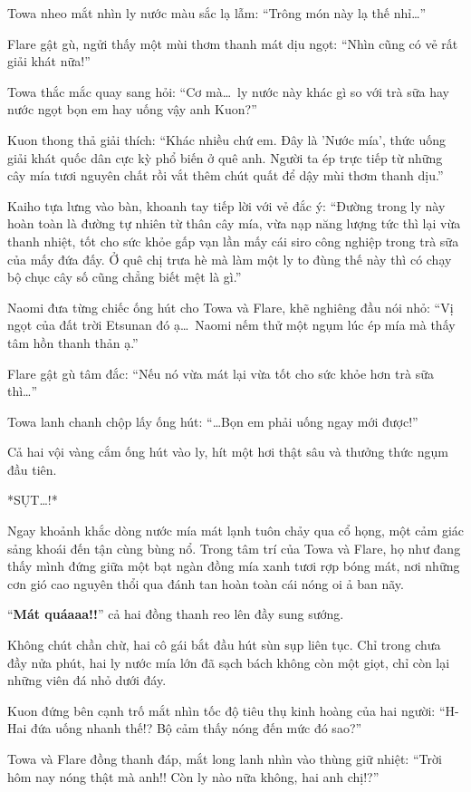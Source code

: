 \documentclass[../main.tex]{subfiles}
\begin{document}
Towa nheo mắt nhìn ly nước màu sắc lạ lẫm: ``Trông món này lạ thế nhỉ\dots''

Flare gật gù, ngửi thấy một mùi thơm thanh mát dịu ngọt: ``Nhìn cũng có vẻ rất giải khát nữa!''

Towa thắc mắc quay sang hỏi: ``Cơ mà\dots\ ly nước này khác gì so với trà sữa hay nước ngọt bọn em hay uống vậy anh Kuon?''

Kuon thong thả giải thích: ``Khác nhiều chứ em. Đây là 'Nước mía', thức uống giải khát quốc dân cực kỳ phổ biến ở quê anh. Người ta ép trực tiếp từ những cây mía tươi nguyên chất rồi vắt thêm chút quất để dậy mùi thơm thanh dịu.''

Kaiho tựa lưng vào bàn, khoanh tay tiếp lời với vẻ đắc ý: ``Đường trong ly này hoàn toàn là đường tự nhiên từ thân cây mía, vừa nạp năng lượng tức thì lại vừa thanh nhiệt, tốt cho sức khỏe gấp vạn lần mấy cái siro công nghiệp trong trà sữa của mấy đứa đấy. Ở quê chị trưa hè mà làm một ly to đùng thế này thì có chạy bộ chục cây số cũng chẳng biết mệt là gì.''

Naomi đưa từng chiếc ống hút cho Towa và Flare, khẽ nghiêng đầu nói nhỏ: ``Vị ngọt của đất trời Etsunan đó ạ\dots\ Naomi nếm thử một ngụm lúc ép mía mà thấy tâm hồn thanh thản ạ.''

Flare gật gù tâm đắc: ``Nếu nó vừa mát lại vừa tốt cho sức khỏe hơn trà sữa thì\dots''

Towa lanh chanh chộp lấy ống hút: ``\dots Bọn em phải uống ngay mới được!''

Cả hai vội vàng cắm ống hút vào ly, hít một hơi thật sâu và thưởng thức ngụm đầu tiên.

*SỤT\dots!*

Ngay khoảnh khắc dòng nước mía mát lạnh tuôn chảy qua cổ họng, một cảm giác sảng khoái đến tận cùng bùng nổ. Trong tâm trí của Towa và Flare, họ như đang thấy mình đứng giữa một bạt ngàn đồng mía xanh tươi rợp bóng mát, nơi những cơn gió cao nguyên thổi qua đánh tan hoàn toàn cái nóng oi ả ban nãy.

``\textbf{Mát quáaaa!!}'' cả hai đồng thanh reo lên đầy sung sướng.

Không chút chần chừ, hai cô gái bắt đầu hút sùn sụp liên tục. Chỉ trong chưa đầy nửa phút, hai ly nước mía lớn đã sạch bách không còn một giọt, chỉ còn lại những viên đá nhỏ dưới đáy.

Kuon đứng bên cạnh trố mắt nhìn tốc độ tiêu thụ kinh hoàng của hai người: ``H-Hai đứa uống nhanh thế!? Bộ cảm thấy nóng đến mức đó sao?''

Towa và Flare đồng thanh đáp, mắt long lanh nhìn vào thùng giữ nhiệt: ``Trời hôm nay nóng thật mà anh!! Còn ly nào nữa không, hai anh chị!?''
\end{document}
